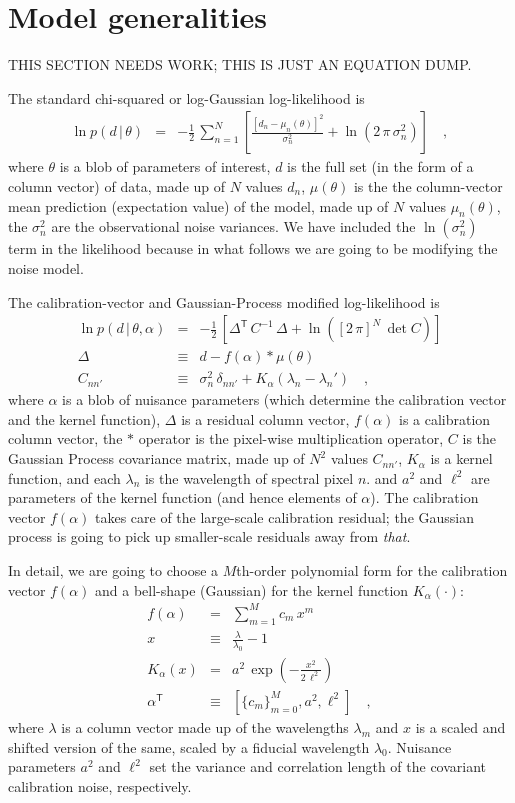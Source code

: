 \documentclass[12pt, letterpaper, preprint]{aastex}
\newcommand{\transpose}[1]{{#1}^{\!\mathsf T}}
\newcommand{\given}{\,|\,}
\begin{document}
\section{Model generalities}

THIS SECTION NEEDS WORK; THIS IS JUST AN EQUATION DUMP.

The standard chi-squared or log-Gaussian log-likelihood is
\begin{eqnarray}
\ln p(d\given\theta) &=& -\frac{1}{2}\,\sum_{n=1}^N \left[\frac{[d_n - \mu_n(\theta)]^2}{\sigma_n^2} + \ln(2\,\pi\,\sigma_n^2) \right]
\quad ,
\end{eqnarray}
where $\theta$ is a blob of parameters of interest,
$d$ is the full set (in the form of a column vector) of data,
made up of $N$ values $d_n$,
$\mu(\theta)$ is the the column-vector mean prediction (expectation value) of the model,
made up of $N$ values $\mu_n(\theta)$,
the $\sigma_n^2$ are the observational noise variances.
We have included the $\ln(\sigma_n^2)$ term in the likelihood because
in what follows we are going to be modifying the noise model.

The calibration-vector and Gaussian-Process modified log-likelihood is
\begin{eqnarray}
\ln p(d\given\theta,\alpha) &=& -\frac{1}{2}\,\left[\transpose{\Delta}\,C^{-1}\,\Delta + \ln([2\,\pi]^N\,\det{C}) \right]
\\
\Delta &\equiv& d - f(\alpha)\ast\mu(\theta)
\\
C_{nn'} &\equiv& \sigma_n^2\,\delta_{nn'} + K_\alpha(\lambda_n - \lambda_n')
\quad ,
\end{eqnarray}
where $\alpha$ is a blob of nuisance parameters
(which determine the calibration vector and the kernel function),
$\Delta$ is a residual column vector,
$f(\alpha)$ is a calibration column vector,
the $\ast$ operator is the pixel-wise multiplication operator,
$C$ is the Gaussian Process covariance matrix,
made up of $N^2$ values $C_{nn'}$,
$K_\alpha$ is a kernel function,
and each $\lambda_n$ is the wavelength of spectral pixel $n$.
and $a^2$ and $\ell^2$ are parameters of the kernel function (and hence elements of $\alpha$).
The calibration vector $f(\alpha)$ takes care of the large-scale
calibration residual; the Gaussian process is going to pick up
smaller-scale residuals away from \emph{that}.

In detail, we are going to choose a $M$th-order polynomial form for
the calibration vector $f(\alpha)$ and a bell-shape (Gaussian) for the
kernel function $K_\alpha(\cdot)$:
\begin{eqnarray}
f(\alpha) &=& \sum_{m=1}^M c_m\,x^m
\\
x &\equiv& \frac{\lambda}{\lambda_0} - 1
\\
K_\alpha(x) &=& a^2\,\exp(-\frac{x^2}{2\,\ell^2})
\\
\transpose{\alpha} &\equiv& \left[ \{c_m\}_{m=0}^M, a^2, \ell^2 \right]
\quad ,
\end{eqnarray}
where $\lambda$ is a column vector made up of the wavelengths $\lambda_m$
and $x$ is a scaled and shifted version of the same,
scaled by a fiducial wavelength $\lambda_0$.
Nuisance parameters $a^2$ and $\ell^2$ set the variance and
correlation length of the covariant calibration noise, respectively.
\end{document}
